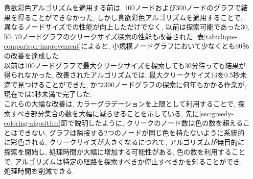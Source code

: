 \documentclass[a4j, 12pt]{jarticle}
\begin{document}
\begin{table}[H]
\centering
\caption{異なるグラフサイズにおける最大クリークサイズと計算時間の比較（改善率付き）}\label{tab:clique-comparison-improvement}
\end{table}

貪欲彩色アルゴリズムを適用する前は, 100ノードおよび300ノードのグラフで結果を得ることができなかった, しかし貪欲彩色アルゴリズムを適用することで, 異なるノードサイズでの性能が向上しただけでなく, 以前は探索可能であった30, 50, 70ノードグラフのクリークサイズ探索の性能も改善された, 表\ref{tab:clique-comparison-improvement}によると, 小規模ノードグラフにおいて少なくとも90％の改善を達成した.\\

以前は100ノードグラフで最大クリークサイズを探索しても30分待っても結果が得られなかった, 改善されたアルゴリズムでは, 最大クリークサイズ14を0.5秒未満で見つけることができた, かつ300ノードグラフの探索に何年もかかる作業が, 現在では5秒未満で完了した.\\

これらの大幅な改善は, カラーグラデーションを上限として利用することで, 探索すべき部分集合の数を大幅に減らせることを示している, 先に\ref{sec:greedy-coloring-algorithm}節で説明したように, クリークのノード数は色の数を超えることはできない, グラフは隣接する2つのノードが同じ色を持たないように系統的に彩色される, クリークサイズが大きくなるにつれて, アルゴリズムが無目的に探索を開始し, 処理時間が大幅に増加する可能性がある, 色の数を利用することで, アルゴリズムは特定の経路を探索すべきか停止すべきかを知ることができ, 処理時間を削減できる.
\end{document}
